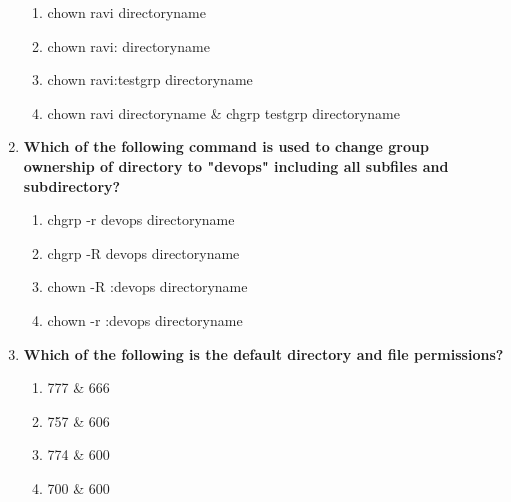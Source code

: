 \begin{flushleft}
\begin{enumerate}
\begin{enumerate}[label=(\alph*)]
			\item chown ravi directoryname
			\item chown ravi: directoryname
			\item chown ravi:testgrp directoryname  %
			\item chown ravi directoryname \& chgrp testgrp directoryname %
		\end{enumerate}
		\bigskip
		\bigskip
		\item \textbf{Which of the following command is used to change group ownership of directory to "devops" including all subfiles and subdirectory?}
		\begin{enumerate}[label=(\alph*)]
			\item chgrp -r devops directoryname  
			\item chgrp -R devops directoryname  %
			\item chown -R :devops directoryname  %
			\item chown -r :devops directoryname
		\end{enumerate}
		\bigskip
		\bigskip
		\item \textbf{Which of the following is the default directory and file permissions?}
		\begin{enumerate}[label=(\alph*)]
			\item 777  \&  666   %
			\item 757  \&  606
			\item 774  \&  600
			\item 700  \&  600
		\end{enumerate}
	\end{enumerate}
	
	
\end{flushleft}
\newpage
